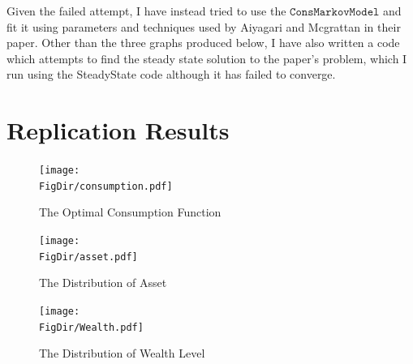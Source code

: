 \documentclass[titlepage,letterpaper]{\econtex}
\begin{document}
Given the failed attempt, I have instead tried to use the  $\texttt{ConsMarkovModel}$ and fit it using parameters and techniques used by Aiyagari and Mcgrattan in their paper. Other than the three graphs produced below, I have also written a code which attempts to find the steady state solution to the paper's problem, which I run using the SteadyState code although it has failed to converge.

\section{Replication Results}\label{sec:Results}


\begin{figure}[H]
  \centering
    \texttt{[image: \\FigDir/consumption.pdf]}
    \caption{The Optimal Consumption Function}
    \label{fig:consumption}
  \end{figure}

  \begin{figure}[H]
      \centering
    \texttt{[image: \\FigDir/asset.pdf]}
    \caption{The Distribution of Asset}
    \label{fig:asset}
  \end{figure}

  \begin{figure}[H]
      \centering
    \texttt{[image: \\FigDir/Wealth.pdf]}
    \caption{The Distribution of Wealth Level}
    \label{fig:wealth}
  \end{figure}

\clearpage\pagebreak\vfill\eject


\end{document}
